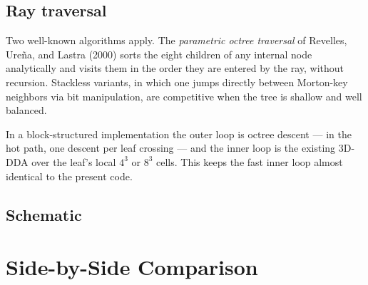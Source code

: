\documentclass[11pt,a4paper]{my_memo}
\begin{document}
\subsection{Ray traversal}

Two well-known algorithms apply.  The \emph{parametric octree traversal} of
Revelles, Ure\~{n}a, and Lastra (2000) sorts the eight children of any
internal node analytically and visits them in the order they are entered by
the ray, without recursion.  Stackless variants, in which one jumps directly
between Morton-key neighbors via bit manipulation, are competitive when the
tree is shallow and well balanced.

In a block-structured implementation the outer loop is octree descent --- in
the hot path, one descent per leaf crossing --- and the inner loop is the
existing 3D-DDA over the leaf's local $4^3$ or $8^3$ cells.  This keeps the
fast inner loop almost identical to the present code.

\subsection{Schematic}

\begin{center}
\end{center}

\section{Side-by-Side Comparison}
\end{document}
